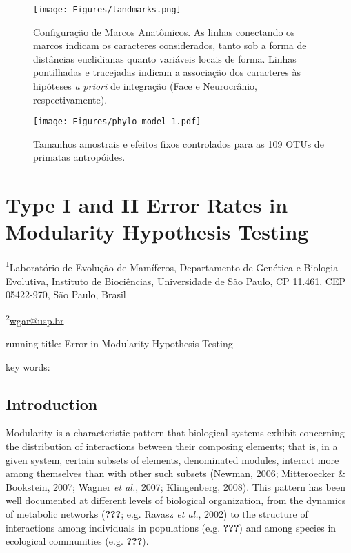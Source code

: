 \documentclass[11pt,twoside]{report}
\begin{document}


\begin{figure}[htbp]
\centering
\texttt{[image: Figures/landmarks.png]}
\caption{Configuração de Marcos Anatômicos. As linhas conectando os
marcos indicam os caracteres considerados, tanto sob a forma de
distâncias euclidianas quanto variáveis locais de forma. Linhas
pontilhadas e tracejadas indicam a associação dos caracteres às
hipóteses \emph{a priori} de integração (Face e Neurocrânio,
respectivamente). \label{fig:landmarks}}
\end{figure}



\begin{figure}[htbp]
\centering
\texttt{[image: Figures/phylo\_model-1.pdf]}
\caption{Tamanhos amostrais e efeitos fixos controlados para as 109 OTUs
de primatas antropóides. \label{fig:phylo_model}}
\end{figure}

\def\sectionautorefname{Section} \def\chapterautorefname{Chapter}
\def\figureautorefname{Figure} \def\tableautorefname{Table}


\newpage
\chapter{Type I and II Error Rates in Modularity Hypothesis Testing}
\label{ch:modcomp}

\textsuperscript{1}Laboratório de Evolução de Mamíferos, Departamento de
Genética e Biologia Evolutiva, Instituto de Biociências, Universidade de
São Paulo, CP 11.461, CEP 05422-970, São Paulo, Brasil

\textsuperscript{2}\href{mailto:wgar@usp.br}{wgar@usp.br}

running title: Error in Modularity Hypothesis Testing

key words:

\section{Introduction}\label{introduction}

Modularity is a characteristic pattern that biological systems exhibit
concerning the distribution of interactions between their composing
elements; that is, in a given system, certain subsets of elements,
denominated modules, interact more among themselves than with other such
subsets (Newman, 2006; Mitteroecker \& Bookstein, 2007; Wagner \emph{et
al.}, 2007; Klingenberg, 2008). This pattern has been well documented at
different levels of biological organization, from the dynamics of
metabolic networks ({\textbf{???}}; e.g. Ravasz \emph{et al.}, 2002) to
the structure of interactions among individuals in populations (e.g.
{\textbf{???}}) and among species in ecological communities (e.g.
{\textbf{???}}).
\end{document}
